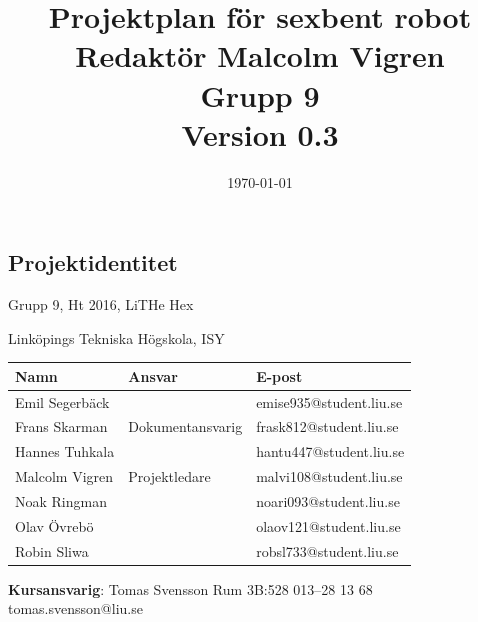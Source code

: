 \documentclass[a4paper,titlepage,12pt]{article}
\begin{document}
	\title{\LARGE
		\textbf{Projektplan för sexbent robot} \\
		\vspace*{0.5\baselineskip}
		\large
		Redaktör Malcolm Vigren \\
		Grupp 9 \\
		\small
		\vspace*{0.5\baselineskip}
		Version 0.3}

	\date{\today}

		\maketitle
	
	\newpage
	
	\begin{center}


		\section*{Projektidentitet}
		Grupp 9, Ht 2016, LiTHe Hex

		Linköpings Tekniska Högskola, ISY

		\renewcommand*{\arraystretch}{1.4}
		\begin{longtable}[c]{ l l l }
			\textbf{Namn} & \textbf{Ansvar} & \textbf{E-post} \\ \midrule
			Emil Segerbäck & & emise935@student.liu.se \\ \midrule
			Frans Skarman & Dokumentansvarig & frask812@student.liu.se \\ \midrule
			Hannes Tuhkala & & hantu447@student.liu.se \\ \midrule
			Malcolm Vigren & Projektledare & malvi108@student.liu.se \\ \midrule
			Noak Ringman &  & noari093@student.liu.se \\ \midrule
			Olav Övrebö &  & olaov121@student.liu.se \\ \midrule
			Robin Sliwa & & robsl733@student.liu.se \\
		\end{longtable}

		\centering
		\textbf{Kursansvarig}: Tomas Svensson Rum 3B:528 013--28 13 68 tomas.svensson@liu.se

		\newpage
		\tableofcontents
		\newpage



\end{center}
\end{document}
